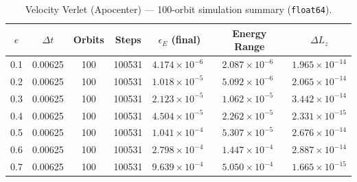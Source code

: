 \documentclass[twocolumn, 10pt]{article}
\begin{document}
\begin{table}[htbp]
\centering
\caption{Velocity Verlet (Apocenter) --- 100-orbit simulation summary (\texttt{float64}).}
\label{tab:verlet_apo}
\begin{tabular}{@{}ccccccc@{}}
\toprule
$e$ & $\Delta t$ & Orbits & Steps & $\epsilon_E$ (final) & Energy Range & $\Delta L_z$ \\
\midrule
0.1 & 0.00625 & 100 & 100531 & $4.174 \times 10^{-6\phantom{0}}$ & $2.087 \times 10^{-6\phantom{0}}$ & $1.965 \times 10^{-14}$ \\
0.2 & 0.00625 & 100 & 100531 & $1.018 \times 10^{-5\phantom{0}}$ & $5.092 \times 10^{-6\phantom{0}}$ & $2.065 \times 10^{-14}$ \\
0.3 & 0.00625 & 100 & 100531 & $2.123 \times 10^{-5\phantom{0}}$ & $1.062 \times 10^{-5\phantom{0}}$ & $3.442 \times 10^{-14}$ \\
0.4 & 0.00625 & 100 & 100531 & $4.504 \times 10^{-5\phantom{0}}$ & $2.262 \times 10^{-5\phantom{0}}$ & $2.331 \times 10^{-15}$ \\
0.5 & 0.00625 & 100 & 100531 & $1.041 \times 10^{-4\phantom{0}}$ & $5.307 \times 10^{-5\phantom{0}}$ & $2.676 \times 10^{-14}$ \\
0.6 & 0.00625 & 100 & 100531 & $2.798 \times 10^{-4\phantom{0}}$ & $1.447 \times 10^{-4\phantom{0}}$ & $2.887 \times 10^{-14}$ \\
0.7 & 0.00625 & 100 & 100531 & $9.639 \times 10^{-4\phantom{0}}$ & $5.050 \times 10^{-4\phantom{0}}$ & $1.665 \times 10^{-15}$ \\
\bottomrule
\end{tabular}
\end{table}
\end{document}
